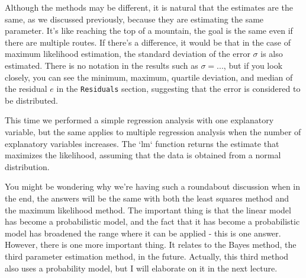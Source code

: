 \documentclass{ltjbook}
\begin{document}
Although the methods may be different, it is natural that the estimates are the same, as we discussed previously, because they are estimating the same parameter. It's like reaching the top of a mountain, the goal is the same even if there are multiple routes.
If there's a difference, it would be that in the case of maximum likelihood estimation, the standard deviation of the error $\sigma$ is also estimated. There is no notation in the results such as $\sigma=...$, but if you look closely, you can see the minimum, maximum, quartile deviation, and median of the residual $e$ in the \verb|Residuals| section, suggesting that the error is considered to be distributed.

This time we performed a simple regression analysis with one explanatory variable, but the same applies to multiple regression analysis when the number of explanatory variables increases. The `lm` function returns the estimate that maximizes the likelihood, assuming that the data is obtained from a normal distribution.

You might be wondering why we're having such a roundabout discussion when in the end, the answers will be the same with both the least squares method and the maximum likelihood method.
The important thing is that the linear model has become a probabilistic model, and the fact that it has become a probabilistic model has broadened the range where it can be applied - this is one answer.
However, there is one more important thing. It relates to the Bayes method, the third parameter estimation method, in the future. Actually, this third method also uses a probability model, but I will elaborate on it in the next lecture.
\end{document}
